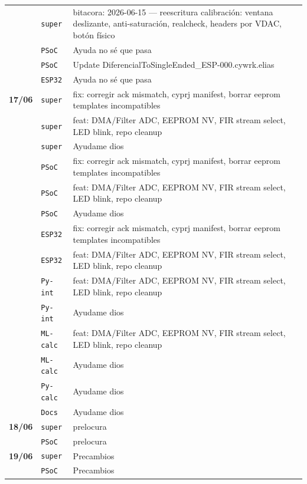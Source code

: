 \begin{longtable}{@{}p{1.7cm} p{1.5cm} p{12.2cm}@{}}
 & \texttt{\scriptsize super} & bitacora: 2026-06-15 --- reescritura calibración: ventana deslizante, anti-saturación, realcheck, headers por VDAC, botón físico \\
 & \texttt{\scriptsize PSoC} & Ayuda no sé que pasa \\
 & \texttt{\scriptsize PSoC} & Update DiferencialToSingleEnded\_ESP-000.cywrk.elias \\
 & \texttt{\scriptsize ESP32} & Ayuda no sé que pasa \\
\textbf{17/06} & \texttt{\scriptsize super} & fix: corregir ack mismatch, cyprj manifest, borrar eeprom templates incompatibles \\
 & \texttt{\scriptsize super} & feat: DMA/Filter ADC, EEPROM NV, FIR stream select, LED blink, repo cleanup \\
 & \texttt{\scriptsize super} & Ayudame dios \\
 & \texttt{\scriptsize PSoC} & fix: corregir ack mismatch, cyprj manifest, borrar eeprom templates incompatibles \\
 & \texttt{\scriptsize PSoC} & feat: DMA/Filter ADC, EEPROM NV, FIR stream select, LED blink, repo cleanup \\
 & \texttt{\scriptsize PSoC} & Ayudame dios \\
 & \texttt{\scriptsize ESP32} & fix: corregir ack mismatch, cyprj manifest, borrar eeprom templates incompatibles \\
 & \texttt{\scriptsize ESP32} & feat: DMA/Filter ADC, EEPROM NV, FIR stream select, LED blink, repo cleanup \\
 & \texttt{\scriptsize Py-int} & feat: DMA/Filter ADC, EEPROM NV, FIR stream select, LED blink, repo cleanup \\
 & \texttt{\scriptsize Py-int} & Ayudame dios \\
 & \texttt{\scriptsize ML-calc} & feat: DMA/Filter ADC, EEPROM NV, FIR stream select, LED blink, repo cleanup \\
 & \texttt{\scriptsize ML-calc} & Ayudame dios \\
 & \texttt{\scriptsize Py-calc} & Ayudame dios \\
 & \texttt{\scriptsize Docs} & Ayudame dios \\
\textbf{18/06} & \texttt{\scriptsize super} & prelocura \\
 & \texttt{\scriptsize PSoC} & prelocura \\
\textbf{19/06} & \texttt{\scriptsize super} & Precambios \\
 & \texttt{\scriptsize PSoC} & Precambios \\

\end{longtable}
